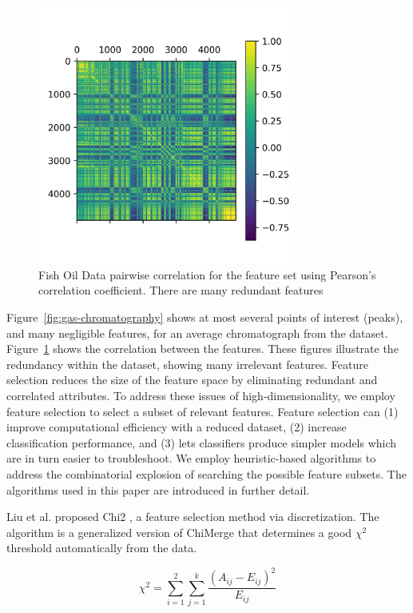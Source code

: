 \documentclass[runningheads]{llncs}
\begin{document}
\begin{figure}[htb]
  \centering
  \includegraphics[width=8.5cm]{fish_correlation_matrix.png}
  \caption{
    Fish Oil Data pairwise correlation for the feature set using Pearson's correlation coefficient.
    There are many redundant features
    }
  \label{fig:correlation-matrix} 
  \captionsetup[figure]{font=small,labelfont=small}
\end{figure}

Figure~\ref{fig:gas-chromatography} shows at most several points of interest (peaks), and many negligible features, for an average chromatograph from the dataset. 
Figure~\ref{fig:correlation-matrix} shows the correlation between the features.
These figures illustrate the redundancy within the dataset, showing many irrelevant features. 
Feature selection reduces the size of the feature space by eliminating redundant and correlated attributes. 
To address these issues of high-dimensionality, we employ feature selection to select a subset of relevant features. 
Feature selection can (1) improve computational efficiency with a reduced dataset, (2) increase classification performance, and (3) lets classifiers produce simpler models which are in turn easier to troubleshoot.
We employ heuristic-based algorithms to address the combinatorial explosion of searching the possible feature subsets.
The algorithms used in this paper are introduced in further detail.

Liu et al. proposed Chi2 \cite{liu1995chi2}, a feature selection method via discretization. 
The algorithm is a generalized version of ChiMerge \cite{kerber1992chimerge} that determines a good $\chi^2$ threshold automatically from the data.

\begin{equation}
  \chi^2 = \sum_{i=1}^2 \sum_{j=1}^k \frac{(A_{ij} - E_{ij})^2}{E_{ij}}
  \label{eq:chi}
\end{equation}
\end{document}
